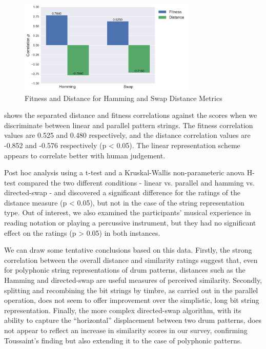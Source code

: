 {{\begin{figure}
	\begin{center}
		\includegraphics[width=0.75\textwidth]{ch03_symbolic/figures/measure_bar.pdf}
	\end{center}
	\caption[Fitness and Distance for Hamming and Swap Distance Metrics]{Fitness and Distance for Hamming and Swap Distance Metrics}
	\label{fig:hamming_versus_swap}
\end{figure}

 shows the separated distance and fitness correlations against the scores when we discriminate between linear and parallel pattern strings. The fitness correlation values are 0.525 and 0.480 respectively, and the distance correlation values are -0.852 and -0.576 respectively (p < 0.05). The linear representation scheme appears to correlate better with human judgement.

Post hoc analysis using a t-test and a Kruskal-Wallis non-parameteric \acrshort{anova} H-test compared the two different conditions - linear vs. parallel and hamming vs. directed-swap - and discovered a significant difference for the ratings of the distance measure (p < 0.05), but not in the case of the string representation type. Out of interest, we also examined the participants' musical experience in reading notation or playing a percussive instrument, but they had no significant effect on the ratings (p > 0.05) in both instances.

We can draw some tentative conclusions based on this data. Firstly, the strong correlation between the overall distance and similarity ratings suggest that, even for polyphonic string representations of drum patterns, distances such as the Hamming and directed-swap are useful measures of perceived similarity. Secondly, splitting and recombining the bit strings by timbre, as carried out in the parallel operation, does not seem to offer improvement over the simplistic, long bit string representation. Finally, the more complex directed-swap algorithm, with its ability to capture the ``horizontal'' displacement between two drum patterns, does not appear to reflect an increase in similarity scores in our survey, confirming Toussaint's finding but also extending it to the case of polyphonic patterns.

}}
